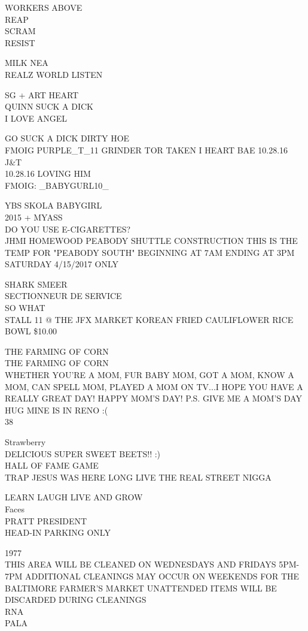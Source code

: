 \documentclass[10pt,letterpaper]{article}
\begin{document}
WORKERS ABOVE\\
REAP\\
SCRAM\\
RESIST

MILK NEA\\
REALZ WORLD LISTEN

SG + ART HEART\\
QUINN SUCK A DICK\\
I LOVE ANGEL

GO SUCK A DICK DIRTY HOE\\
FMOIG PURPLE\_T\_11 GRINDER TOR TAKEN I HEART BAE  10.28.16 J\&T\\
10.28.16 LOVING HIM\\
FMOIG: \_BABYGURL10\_

YBS SKOLA BABYGIRL\\
2015 + MYASS\\
DO YOU USE E{-}CIGARETTES?\\
JHMI HOMEWOOD PEABODY SHUTTLE CONSTRUCTION THIS IS THE TEMP FOR "PEABODY SOUTH" BEGINNING AT 7AM ENDING AT 3PM SATURDAY 4/15/2017 ONLY

SHARK SMEER\\
SECTIONNEUR DE SERVICE\\
SO WHAT\\
STALL 11 @ THE JFX MARKET KOREAN FRIED CAULIFLOWER RICE BOWL \$10.00

THE FARMING OF CORN\\
THE FARMING OF CORN\\
WHETHER YOU'RE A MOM, FUR BABY MOM, GOT A MOM, KNOW A MOM, CAN SPELL MOM, PLAYED A MOM ON TV...I HOPE YOU HAVE A REALLY GREAT DAY!  HAPPY MOM'S DAY!  P.S. GIVE ME A MOM'S DAY HUG MINE IS IN RENO :(\\
38

Strawberry\\
DELICIOUS SUPER SWEET BEETS!! :)\\
HALL OF FAME GAME\\
TRAP JESUS WAS HERE LONG LIVE THE REAL STREET NIGGA

LEARN LAUGH LIVE AND GROW\\
Faces\\
PRATT PRESIDENT\\
HEAD{-}IN PARKING ONLY

1977\\
THIS AREA WILL BE CLEANED ON WEDNESDAYS AND FRIDAYS 5PM{-}7PM ADDITIONAL CLEANINGS MAY OCCUR ON WEEKENDS FOR THE BALTIMORE FARMER'S MARKET UNATTENDED ITEMS WILL BE DISCARDED DURING CLEANINGS\\
RNA\\
PALA
\end{document}

